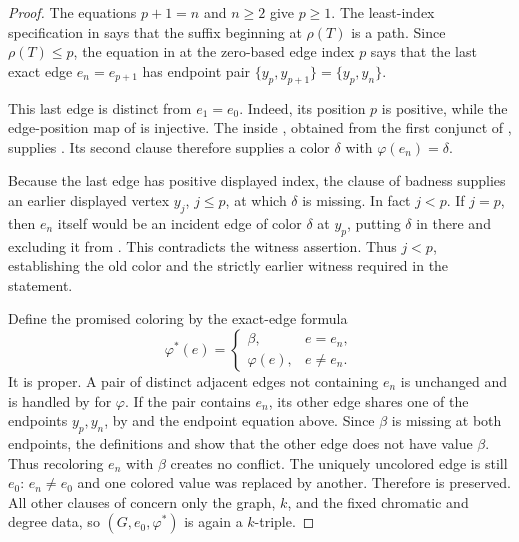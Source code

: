 \begin{proof}
The equations \(p+1=n\) and \(n\geq2\) give \(p\geq1\).  The
least-index specification in  says that the
suffix beginning at \(\rho(T)\) is a path.  Since
\(\rho(T)\leq p\), the equation in  at
the zero-based edge index \(p\) says that the last exact edge
\(e_n=e_{p+1}\) has endpoint pair
\(\{y_p,y_{p+1}\}=\{y_p,y_n\}\).

This last edge is distinct from \(e_1=e_0\).  Indeed, its position \(p\)
is positive, while the edge-position map of  is
injective.  The  inside
, obtained from the first conjunct of
, supplies
.  Its second clause therefore supplies a
color \(\delta\) with \(\varphi(e_n)=\delta\).

Because the last edge has positive displayed index, the
 clause of badness supplies an earlier displayed
vertex \(y_j\), \(j\leq p\), at which \(\delta\) is missing.  In fact
\(j<p\).  If \(j=p\), then \(e_n\) itself would be an incident edge of
color \(\delta\) at \(y_p\), putting \(\delta\) in
 there and excluding it from
.  This contradicts the witness assertion.
Thus \(j<p\), establishing the old color and the strictly earlier
witness required in the statement.

Define the promised coloring by the exact-edge formula
\[
 \varphi^*(e)=
 \begin{cases}
   \beta,&e=e_n,\\
   \varphi(e),&e\ne e_n.
 \end{cases}
\]
It is proper.  A pair of distinct adjacent edges not containing \(e_n\)
is unchanged and is handled by  for
\(\varphi\).  If the pair contains \(e_n\), its other edge shares one of
the endpoints \(y_p,y_n\), by  and the endpoint
equation above.  Since \(\beta\) is missing at both endpoints, the
definitions  and  show
that the other edge does not have value \(\beta\).  Thus recoloring
\(e_n\) with \(\beta\) creates no conflict.  The uniquely uncolored edge
is still \(e_0\): \(e_n\ne e_0\) and one colored value was replaced by
another.  Therefore  is preserved.  All
other clauses of  concern only the graph, \(k\), and
the fixed chromatic and degree data, so \((G,e_0,\varphi^*)\) is again a
\(k\)-triple.


\end{proof}
